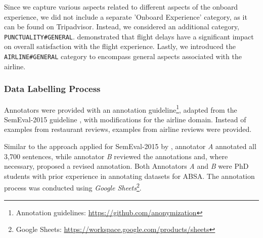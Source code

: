 Since we capture various aspects related to different aspects of the onboard experience, we did not include a separate 'Onboard Experience' category, as it can be found on Tripadvisor. Instead, we considered an additional category, \texttt{PUNCTUALITY\#GENERAL}. \citet{song2020analyzing} demonstrated that flight delays have a significant impact on overall satisfaction with the flight experience. Lastly, we introduced the \texttt{AIRLINE\#GENERAL} category to encompass general aspects associated with the airline.



\subsubsection{Data Labelling Process}

Annotators were provided with an annotation guideline\footnote{Annotation guidelines: \url{https://github.com/anonymization}}, adapted from the SemEval-2015 guideline \citep{pontiki2015semeval}, with modifications for the airline domain. Instead of examples from restaurant reviews, examples from airline reviews were provided.

Similar to the approach applied for SemEval-2015 by \citet{pontiki2015semeval}, annotator \textit{A} annotated all 3,700 sentences, while annotator \textit{B} reviewed the annotations and, where necessary, proposed a revised annotation. Both Annotators \textit{A} and \textit{B} were PhD students with prior experience in annotating datasets for ABSA. The annotation process was conducted using \textit{Google Sheets}\footnote{Google Sheets: \url{https://workspace.google.com/products/sheets}}.

